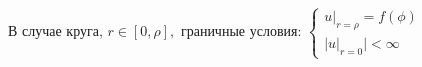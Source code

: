 \begin{remark}
В случае круга, $ r \in [0, \rho],$ граничные условия:
$\begin{cases}
	u |_{r = \rho} = f(\phi) \\
	| u |_{r = 0} | < \infty
\end{cases}$
\end{remark}






















